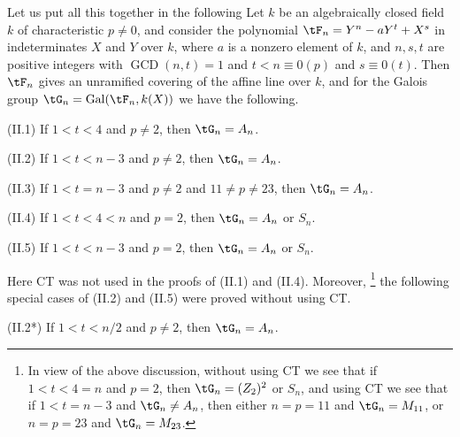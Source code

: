 Let us put all this together in the following
{}
Let $k$ be an algebraically closed field $k$ of 
characteristic $p\ne 0$, and
consider the polynomial $\tF_n=Y^n-aY^t+X^s$ in 
indeterminates $X$ and
$Y$ over $k$, where $a$ is a nonzero element of $k$, and 
$n,s,t$ are positive 
integers with $\operatorname{GCD}(n,t)=1$ and $t<n\equiv 
0(p)$ and 
$s\equiv 0(t)$. Then $\tF_n$ gives an unramified covering 
of the affine line
over $k$, and for the Galois group 
$\tG_n=\operatorname{Gal}(\tF_n,k(X))$ we have the
following.

(II.1) If $1<t<4$ and $p\neq 2$, then $\tG_n=A_n$. 

(II.2) If $1<t<n-3$ and $p\neq 2$, then $\tG_n=A_n$. 

(II.3) If $1<t=n-3$ and $p\neq 2$ and $11\neq p \neq 23$, 
then $\tG_n=A_n$. 

(II.4) If $1<t<4<n$ and $p=2$, then $\tG_n=A_n$ or $S_n$.

(II.5) If $1<t<n-3$ and $p=2$, then $\tG_n=A_n$ or $S_n$.

Here CT was not used in the proofs of (II.1) and (II.4). 
Moreover, 
\footnote{In view of the above discussion, without using CT 
we see that if 
$1<t<4=n$ and $p=2$, then $\tG_n=(Z_2)^2$ or $S_n$, and 
using CT we 
see that
if $1<t=n-3$ and $\tG_n\ne A_n$, then
either
$n=p=11$ and $\tG_n=M_{11}$, or 
$n=p=23$ and $\tG_n=M_{23}$.}
the 
following special cases of (II.2) and (II.5) were proved 
without using CT.

(II.2*) If $1<t<n/2$ and $p\ne 2$, then $\tG_n=A_n$.

